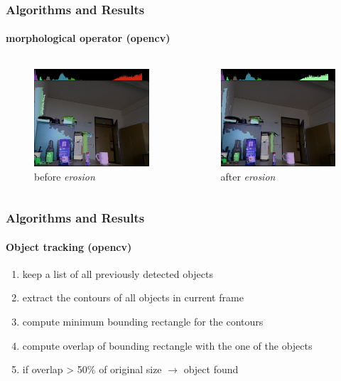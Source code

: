 \documentclass[]{beamer}
\begin{document}
\begin{frame}
    \frametitle{Algorithms and Results}
    \framesubtitle{morphological operator (opencv)}
    \begin{columns}
        \begin{column}{5 cm} 
        \begin{figure}[h]
            \centering
            \includegraphics[width=5cm]{../images/cluster_bli_erode.jpg}
            \caption{before \emph{erosion}}
        \end{figure}
            
        \end{column}
        \begin{column}{5 cm}
            \begin{figure}[h]
                \centering
                \includegraphics[width=5cm]{../images/cluster_im_erode.jpg}
                \caption{after \emph{erosion}}
            \end{figure}
        \end{column}
    \end{columns}
\end{frame}



\begin{frame}
    \frametitle{Algorithms and Results}
    \framesubtitle{Object tracking (opencv)}
    
    \begin{enumerate}
        \item<1-> keep a list of all previously detected objects
        \item<2-> extract the contours of all objects in current frame
        \item<3-> compute minimum bounding rectangle for the contours
        \item<4-> compute overlap of bounding rectangle with the one of the objects
        \item<5-> if overlap > 50\% of original size $\rightarrow$ object found
    \end{enumerate}
\end{frame}
\end{document}
